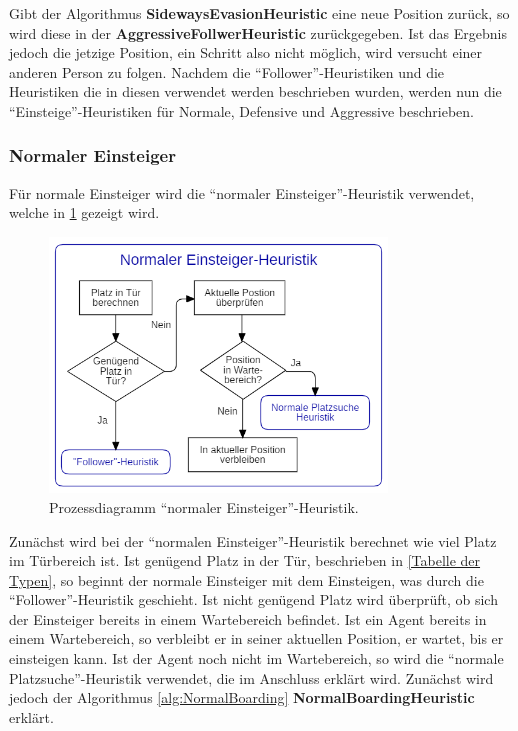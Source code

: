 Gibt der Algorithmus \textbf{SidewaysEvasionHeuristic} eine neue Position zurück, so wird diese in der \textbf{AggressiveFollwerHeuristic} zurückgegeben. Ist das Ergebnis jedoch die jetzige Position, ein Schritt also nicht möglich, wird versucht einer anderen Person zu folgen.
Nachdem die "`Follower"'-Heuristiken und die Heuristiken die in diesen verwendet werden beschrieben wurden, werden nun die "`Einsteige"'-Heuristiken für Normale, Defensive und Aggressive beschrieben.

\subsubsection{Normaler Einsteiger} 
Für normale Einsteiger wird die "`normaler Einsteiger"'-Heuristik verwendet, welche in \figurename \ref{fig:NEH} gezeigt wird.
\begin{figure}[H]
	\centering
		\includegraphics[width=0.8\textwidth]{pictures/model/algorithm/boarding/normal_boarding/normal_boarding_heuristic.png}
	\caption{Prozessdiagramm "`normaler Einsteiger"'-Heuristik.}
	\label{fig:NEH}
\end{figure}
Zunächst wird bei der "`normalen Einsteiger"'-Heuristik berechnet wie viel Platz im Türbereich ist. Ist genügend Platz in der Tür, beschrieben in \ref{Tabelle der Typen}, so beginnt der normale Einsteiger mit dem Einsteigen, was durch die "`Follower"'-Heuristik geschieht. Ist nicht genügend Platz wird überprüft, ob sich der Einsteiger bereits in einem Wartebereich befindet. Ist ein Agent bereits in einem Wartebereich, so verbleibt er in seiner aktuellen Position, er wartet, bis er einsteigen kann. Ist der Agent noch nicht im Wartebereich, so wird die "`normale Platzsuche"'-Heuristik verwendet, die im Anschluss erklärt wird. Zunächst wird jedoch der Algorithmus \ref{alg:NormalBoarding} \textbf{NormalBoardingHeuristic} erklärt. 
\clearpage

